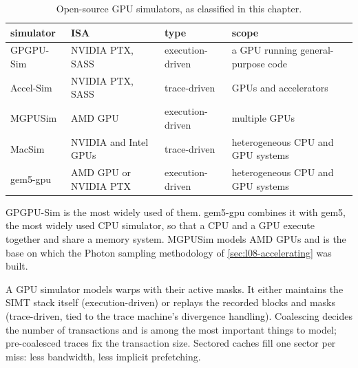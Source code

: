\documentclass[../main.tex]{subfiles}
\begin{document}
\begin{table}[tb]
  \centering
  \caption{Open-source GPU simulators, as classified in this chapter.}
  \label{tab:l08-simulators}
  \setlength{\tabcolsep}{4pt}
  \begin{tabular}{@{}>{\raggedright\arraybackslash}p{24mm}
                  >{\raggedright\arraybackslash}p{25mm}
                  >{\raggedright\arraybackslash}p{19mm}
                  >{\raggedright\arraybackslash}p{40mm}@{}}
    \toprule
    simulator & ISA & type & scope \\
    \midrule
    GPGPU-Sim \cite{bakhoda2009gpgpusim} & NVIDIA PTX, SASS
      & execution-driven & a GPU running general-purpose code \\
    Accel-Sim \cite{khairy2020accelsim} & NVIDIA PTX, SASS
      & trace-driven & GPUs and accelerators \\
    MGPUSim \cite{sun2019mgpusim} & AMD GPU & execution-driven
      & multiple GPUs \\
    MacSim \cite{gthparch2026macsim} & NVIDIA and Intel GPUs
      & trace-driven & heterogeneous CPU and GPU systems \\
    gem5-gpu \cite{power2015gem5gpu} & AMD GPU or NVIDIA PTX
      & execution-driven & heterogeneous CPU and GPU systems \\
    \bottomrule
  \end{tabular}
\end{table}

GPGPU-Sim is the most widely used of them.  gem5-gpu combines it with
gem5, the most widely used CPU simulator, so that a CPU and a GPU
execute together and share a memory system.  MGPUSim models AMD GPUs
and is the base on which the Photon sampling methodology of
\cref{sec:l08-accelerating} was built.

\begin{keypoint}
  A GPU simulator models warps with their active masks.  It either
  maintains the SIMT stack itself (execution-driven) or replays the
  recorded blocks and masks (trace-driven, tied to the trace machine's
  divergence handling).  Coalescing decides the number of transactions
  and is among the most important things to model; pre-coalesced
  traces fix the transaction size.  Sectored caches fill one sector per
  miss: less bandwidth, less implicit prefetching.
\end{keypoint}
\end{document}

